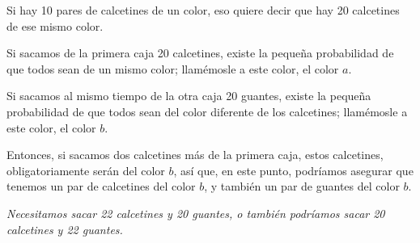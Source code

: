 Si hay 10 pares de calcetines de un color, eso quiere decir que hay 20 calcetines de ese mismo color.

Si sacamos de la primera caja 20 calcetines, existe la pequeña probabilidad de que todos sean de un mismo color; llamémosle a este color, el color $a$.

Si sacamos al mismo tiempo de la otra caja 20 guantes, existe la pequeña probabilidad de que todos sean del color diferente de los calcetines; llamémosle a este color, el color $b$.

Entonces, si sacamos dos calcetines más de la primera caja, estos calcetines, obligatoriamente serán del color $b$, así que, en este punto, podríamos asegurar que tenemos un par de calcetines del color $b$, y también un par de guantes del color $b$.

\begin{center}
  \textit{Necesitamos sacar 22 calcetines y 20 guantes, o también podríamos sacar 20 calcetines y 22 guantes.}
\end{center}
